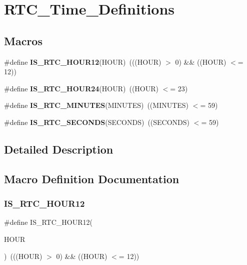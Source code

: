 \section{R\+T\+C\+\_\+\+Time\+\_\+\+Definitions}
\label{group__RTC__Time__Definitions}
\subsection*{Macros}
\begin{DoxyCompactItemize}
\item 
\#define \textbf{ I\+S\+\_\+\+R\+T\+C\+\_\+\+H\+O\+U\+R12}(H\+O\+UR)~(((H\+O\+UR) $>$ 0) \&\& ((H\+O\+UR) $<$= 12))
\item 
\#define \textbf{ I\+S\+\_\+\+R\+T\+C\+\_\+\+H\+O\+U\+R24}(H\+O\+UR)~((H\+O\+UR) $<$= 23)
\item 
\#define \textbf{ I\+S\+\_\+\+R\+T\+C\+\_\+\+M\+I\+N\+U\+T\+ES}(M\+I\+N\+U\+T\+ES)~((M\+I\+N\+U\+T\+ES) $<$= 59)
\item 
\#define \textbf{ I\+S\+\_\+\+R\+T\+C\+\_\+\+S\+E\+C\+O\+N\+DS}(S\+E\+C\+O\+N\+DS)~((S\+E\+C\+O\+N\+DS) $<$= 59)
\end{DoxyCompactItemize}


\subsection{Detailed Description}


\subsection{Macro Definition Documentation}
\mbox{\label{group__RTC__Time__Definitions_ga6bdfe3bed0a57dfafc2d1de785d48a62}} 
\subsubsection{I\+S\+\_\+\+R\+T\+C\+\_\+\+H\+O\+U\+R12}
{\footnotesize\ttfamily \#define I\+S\+\_\+\+R\+T\+C\+\_\+\+H\+O\+U\+R12(\begin{DoxyParamCaption}\item[{}]{H\+O\+UR }\end{DoxyParamCaption})~(((H\+O\+UR) $>$ 0) \&\& ((H\+O\+UR) $<$= 12))}




